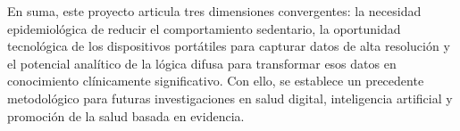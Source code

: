 En suma, este proyecto articula tres dimensiones convergentes: la necesidad epidemiológica de reducir el comportamiento sedentario, la oportunidad tecnológica de los dispositivos portátiles para capturar datos de alta resolución y el potencial analítico de la lógica difusa para transformar esos datos en conocimiento clínicamente significativo. Con ello, se establece un precedente metodológico para futuras investigaciones en salud digital, inteligencia artificial y promoción de la salud basada en evidencia.


